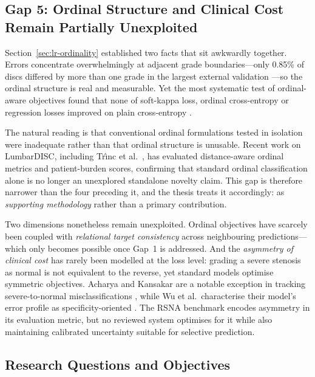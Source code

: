 \subsection{Gap 5: Ordinal Structure and Clinical Cost Remain Partially Unexploited}
\label{sec:lr-gap-ordinal}

Section~\ref{sec:lr-ordinality} established two facts that sit awkwardly
together. Errors concentrate overwhelmingly at adjacent grade boundaries---only
0.85\% of discs differed by more than one grade in the largest external
validation \cite{mcsweeney2023external}---so the ordinal structure is real and
measurable. Yet the most systematic test of ordinal-aware objectives found that
none of soft-kappa loss, ordinal cross-entropy or regression losses improved on
plain cross-entropy \cite{niemeyer2021a}.

The natural reading is that conventional ordinal formulations tested in isolation
were inadequate rather than that ordinal structure is unusable. Recent work on
LumbarDISC, including Tr{\^\i}nc et al.\ \cite{trinc2026beyond}, has evaluated
distance-aware ordinal metrics and patient-burden scores, confirming that standard
ordinal classification alone is no longer an unexplored standalone novelty claim.
This gap is therefore narrower than the four preceding it, and the thesis treats
it accordingly: as \emph{supporting methodology} rather than a primary
contribution.

Two dimensions nonetheless remain unexploited. Ordinal objectives have scarcely
been coupled with \emph{relational target consistency} across neighbouring
predictions---which only becomes possible once Gap~1 is addressed. And the
\emph{asymmetry of clinical cost} has rarely been modelled at the loss level:
grading a severe stenosis as normal is not equivalent to the reverse, yet
standard models optimise symmetric objectives. Acharya and Kansakar are a notable
exception in tracking severe-to-normal misclassifications
\cite{acharya2026disccentric}, while Wu et al.\ characterise their model's error
profile as specificity-oriented \cite{wu2026external}. The RSNA benchmark encodes
asymmetry in its evaluation metric, but no reviewed system optimises for it while
also maintaining calibrated uncertainty suitable for selective prediction.

\subsection{Research Questions and Objectives}
\label{sec:lr-questions}

